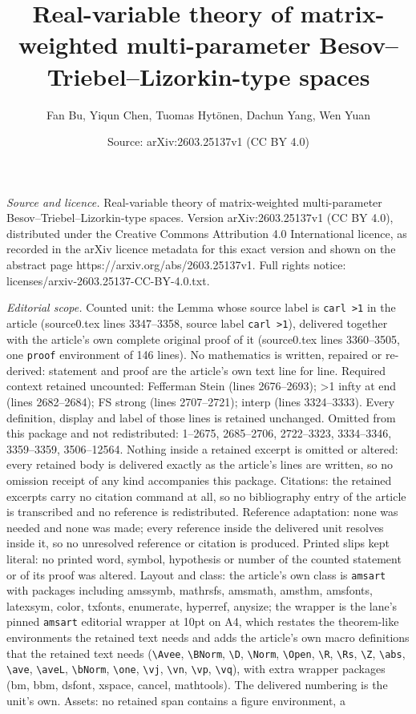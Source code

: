 \documentclass[10pt,a4paper]{amsart}
\title[Real-variable theory of matrix-weighted multi-parameter Beso]{Real-variable theory of matrix-weighted multi-parameter Besov--Triebel--Lizorkin-type spaces}
\author{Fan Bu, Yiqun Chen, Tuomas Hyt\"onen, Dachun Yang, Wen Yuan}
\date{Source: arXiv:2603.25137v1 (CC BY 4.0)}
\begin{document}
\maketitle

\noindent\emph{Source and licence.} Real-variable theory of matrix-weighted multi-parameter Besov--Triebel--Lizorkin-type spaces. Version arXiv:2603.25137v1 (CC BY 4.0), distributed under the Creative Commons Attribution 4.0 International licence, as recorded in the arXiv licence metadata for this exact version and shown on the abstract page https://arxiv.org/abs/2603.25137v1. Full rights notice: licenses/arxiv-2603.25137-CC-BY-4.0.txt.\par\smallskip

\noindent\textit{Editorial scope.} Counted unit: the Lemma whose source label is \texttt{carl >1} in the article (source0.tex lines 3347--3358, source label \texttt{carl >1}), delivered together with the article's own complete original proof of it (source0.tex lines 3360--3505, one \texttt{proof} environment of 146 lines). No mathematics is written, repaired or re-derived: statement and proof are the article's own text line for line. Required context retained uncounted: Fefferman Stein (lines 2676--2693); >1 infty at end (lines 2682--2684); FS strong (lines 2707--2721); interp (lines 3324--3333). Every definition, display and label of those lines is retained unchanged. Omitted from this package and not redistributed: 1--2675, 2685--2706, 2722--3323, 3334--3346, 3359--3359, 3506--12564. Nothing inside a retained excerpt is omitted or altered: every retained body is delivered exactly as the article's lines are written, so no omission receipt of any kind accompanies this package. Citations: the retained excerpts carry no citation command at all, so no bibliography entry of the article is transcribed and no reference is redistributed. Reference adaptation: none was needed and none was made; every reference inside the delivered unit resolves inside it, so no unresolved reference or citation is produced. Printed slips kept literal: no printed word, symbol, hypothesis or number of the counted statement or of its proof was altered. Layout and class: the article's own class is \texttt{amsart} with packages including amssymb, mathrsfs, amsmath, amsthm, amsfonts, latexsym, color, txfonts, enumerate, hyperref, anysize; the wrapper is the lane's pinned \texttt{amsart} editorial wrapper at 10pt on A4, which restates the theorem-like environments the retained text needs and adds the article's own macro definitions that the retained text needs (\texttt{\textbackslash Avee}, \texttt{\textbackslash BNorm}, \texttt{\textbackslash D}, \texttt{\textbackslash Norm}, \texttt{\textbackslash Open}, \texttt{\textbackslash R}, \texttt{\textbackslash Rs}, \texttt{\textbackslash Z}, \texttt{\textbackslash abs}, \texttt{\textbackslash ave}, \texttt{\textbackslash aveL}, \texttt{\textbackslash bNorm}, \texttt{\textbackslash one}, \texttt{\textbackslash vj}, \texttt{\textbackslash vn}, \texttt{\textbackslash vp}, \texttt{\textbackslash vq}), with extra wrapper packages (bm, bbm, dsfont, xspace, cancel, mathtools). The delivered numbering is the unit's own. Assets: no retained span contains a figure environment, a 
\end{document}
